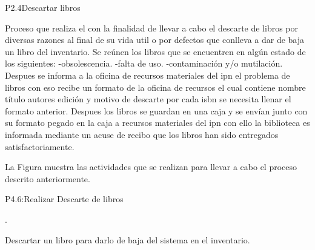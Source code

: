 
\begin{Proceso}{P2.4}{Descartar libros } {
  

  Proceso que realiza el  con la finalidad de llevar a cabo el descarte de libros por diversas razones al final de su vida util o por defectos que conlleva a dar de baja un libro del inventario.
  Se reúnen los libros que se encuentren en algún estado de los siguientes:
  -obsolescencia.
  -falta de uso.
  -contaminación y/o mutilación.
Despues se informa a la oficina de recursos materiales del ipn el problema de libros con eso recibe un formato de la oficina de recursos el cual contiene nombre título autores edición y motivo de descarte por cada isbn se necesita llenar el formato anterior.
Despues los libros se guardan en una caja y se envían junto con su formato pegado en la caja a recursos materiales del ipn con ello la biblioteca  es informada mediante un acuse de recibo que los libros han sido entregados satisfactoriamente.




  \noindent La Figura  muestra las actividades que se realizan para llevar a cabo el proceso descrito anteriormente.


} {P4.6:Realizar Descarte de libros}


   { %
     .
  }

   { %
	Descartar un libro para darlo de baja del sistema en el inventario.
  }


\end{Proceso}
